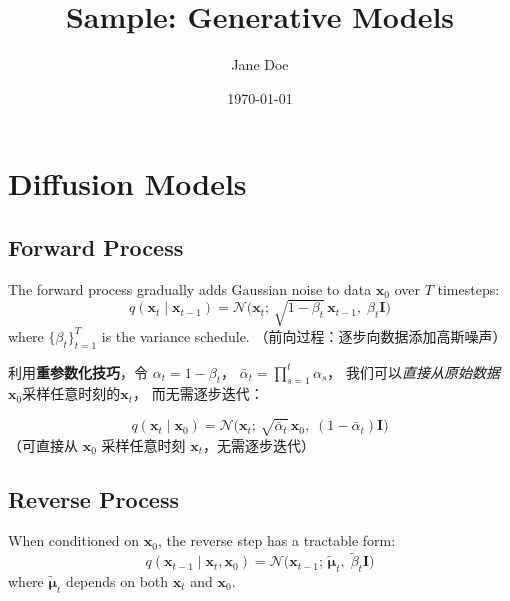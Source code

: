 \documentclass[rep, style=ml]{lexnote}
\title{Sample: Generative Models}
\author{Jane Doe}
\date{\today}
\begin{document}
\maketitle
\tableofcontents

\chapter{Diffusion Models}

\section{Forward Process}

\begin{defn}
  The forward process gradually adds Gaussian noise to data $\mathbf{x}_0$
  over $T$ timesteps:
  \[
    q(\mathbf{x}_t \mid \mathbf{x}_{t-1})
    = \mathcal{N}\!\bigl(\mathbf{x}_t;\,
      \sqrt{1-\beta_t}\,\mathbf{x}_{t-1},\;
      \beta_t \mathbf{I}\bigr)
  \]
  where $\{\beta_t\}_{t=1}^T$ is the variance schedule.
  （前向过程：逐步向数据添加高斯噪声）
\end{defn}

利用\textbf{重参数化技巧}，令 $\alpha_t = 1 - \beta_t$，
$\bar{\alpha}_t = \prod_{s=1}^{t} \alpha_s$，
我们可以\textit{直接从原始数据}$\mathbf{x}_0$采样任意时刻的$\mathbf{x}_t$，
而无需逐步迭代：

\begin{thm}
  \[
    q(\mathbf{x}_t \mid \mathbf{x}_0)
    = \mathcal{N}\!\bigl(\mathbf{x}_t;\,
      \sqrt{\bar{\alpha}_t}\,\mathbf{x}_0,\;
      (1 - \bar{\alpha}_t)\mathbf{I}\bigr)
  \]
  （可直接从 $\mathbf{x}_0$ 采样任意时刻 $\mathbf{x}_t$，无需逐步迭代）
\end{thm}

\section{Reverse Process}

\begin{lem}
  When conditioned on $\mathbf{x}_0$, the reverse step has a tractable form:
  \[
    q(\mathbf{x}_{t-1} \mid \mathbf{x}_t, \mathbf{x}_0)
    = \mathcal{N}\!\bigl(\mathbf{x}_{t-1};\,
      \tilde{\boldsymbol{\mu}}_t,\;
      \tilde{\beta}_t \mathbf{I}\bigr)
  \]
  where $\tilde{\boldsymbol{\mu}}_t$ depends on both $\mathbf{x}_t$
  and $\mathbf{x}_0$.
\end{lem}
\end{document}
